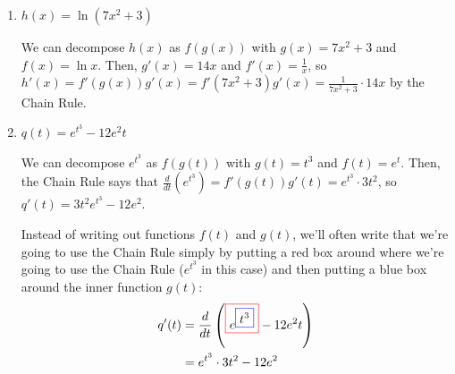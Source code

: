 \documentclass{article}
\begin{document}
\begin{enumerate}
\begin{enumerate}
    

  

  \item
    \begin{problem}[\vfill]
      $h(x) = \ln (7x^2 + 3)$
    \end{problem}

    \begin{solution}
      We can decompose $h(x)$ as $f(g(x))$ with $g(x) = 7x^2 + 3$ and
      $f(x) = \ln x$.  Then, $g'(x) = 14 x$ and $f'(x) = \frac{1}{x}$, so
      $h'(x) = f'(g(x)) g'(x) = f'(7x^2 + 3) g'(x) = \boxed{\frac{1}{7x^2
          + 3} \cdot 14x}$ by the Chain Rule. 
    \end{solution}

  \item
    \begin{problem}[\vfill]
      $q(t) = e^{t^3} - 12 e^2 t$
    \end{problem}

    \begin{solution}
      We can decompose $e^{t^3}$ as $f(g(t))$ with $g(t) = t^3$ and $f(t)
      = e^t$.  Then, the Chain Rule says that $\frac{d}{dt} \left(e^{t^3}
      \right) = f'(g(t)) g'(t) = e^{t^3} \cdot 3t^2$, so $q'(t) =
      \boxed{3t^2 e^{t^3} - 12 e^2}$.

      Instead of writing out functions $f(t)$ and $g(t)$, we'll often
      write that we're going to use the Chain Rule simply by putting a red
      box around where we're going to use the Chain Rule ($e^{t^3}$ in
      this case) and then putting a blue box around the inner function
      $g(t)$: 
      \begin{align*}
        q'(t) &= \frac{d}{dt} \left(\fcolorbox{red}{white}{$\displaystyle
            e^ { \fcolorbox{blue}{white}{$\displaystyle t^ { 3} $}}
            $} - 12 e^2 t \right) \\ 
        &= e^ { t^ { 3} } \cdot 3 t^ { 2} -12 e^2
      \end{align*}
    \end{solution}


\end{enumerate}
\end{enumerate}
\end{document}

